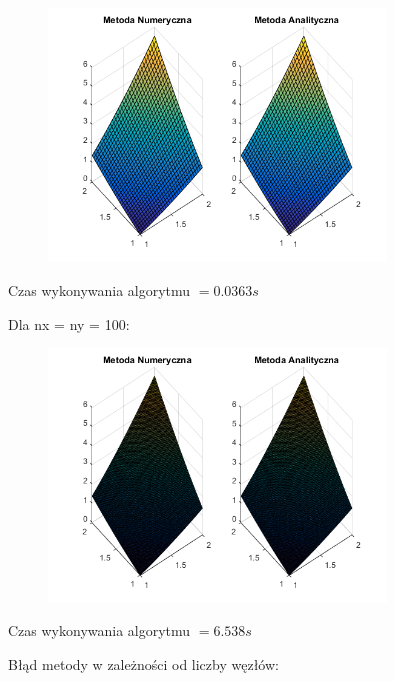 \begin{figure}[!ht]
	\begin{center}
		\includegraphics[width=0.8\textwidth]{Lab5/charts/zad3/30x30.png}
	\end{center}
\end{figure}

Czas wykonywania algorytmu $ = 0.0363 s$

Dla nx = ny = 100:

\begin{figure}[!ht]
	\begin{center}
		\includegraphics[width=0.8\textwidth]{Lab5/charts/zad3/100x100.png}
	\end{center}
\end{figure}

Czas wykonywania algorytmu $ = 6.538 s$

\newpage

Błąd metody w zależności od liczby węzłów:


